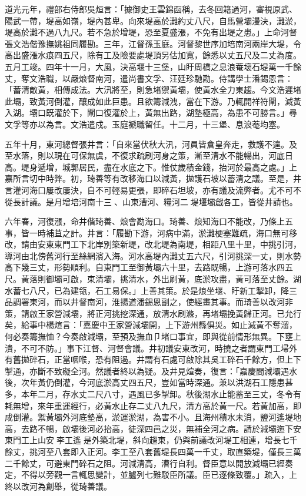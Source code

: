 \begin{pinyinscope}
道光元年，禮部右侍郎吳烜言：「據御史王雲錦函稱，去冬回籍過河，審視原武、陽武一帶，堤高如嶺，堤內甚卑。向來堤高於灘約丈八尺，自馬營壩漫決，灘淤，堤高於灘不過八九尺。若不急於增堤，恐至夏盛漲，不免有出堤之患。」上命河督張文浩偕豫撫姚祖同履勘。三年，江督孫玉庭。河督黎世序加培南河兩岸大堤，令高出盛漲水痕四五尺，除有工及險要處堤頂另估加寬，餘悉以丈五尺及二丈為度。五月工竣。四年十一月，大風，決高堰十三堡，山盱周橋之息浪菴壞石堤萬一千餘丈，奪文浩職，以嚴烺督南河，遣尚書文孚、汪廷珍馳勘。侍講學士潘錫恩言：「蓄清敵黃，相傳成法。大汛將至，則急堵禦黃壩，使黃水全力東趨。今文浩遲堵此壩，致黃河倒灌，釀成如此巨患。且欲籌減洩，當在下游。乃輒開祥符閘，減黃入湖。壩口既灌於下，閘口復灌於上，黃無出路，湖墊極高，為患不可勝言。」尋文孚等亦以為言。文浩遣戍。玉庭褫職留任。十二月，十三堡、息浪菴均塞。

五年十月，東河總督張井言：「自來當伏秋大汛，河員皆倉皇奔走，救護不遑。及至水落，則以現在可保無虞，不復求疏刷河身之策，漸至清水不能暢出，河底日高。堤身遞增，城郭居民，盡在水底之下。惟仗歲積金錢，抬河於最高之處。」上嘉所言切中時弊。初，琦善等有改移海口以減黃，拋護石坡以蓄清之議。至是，井言灌河海口屢改屢決，自不可輕易更張，即碎石坦坡，亦有議及流弊者。尤不可不從長計議。是月增培河南十三、山東漕河、糧河二堤堰壩戧各工，皆從井請也。

六年春，河復漲，命井偕琦善、烺會勘海口。琦善、烺知海口不能改，乃條上五事，皆一時補苴之計。井言：「履勘下游，河病中滿，淤灘梗塞難疏，海口無可移改，請由安東東門工下北岸別築新堤，改北堤為南堤，相距八里十里，中挑引河，導河由北傍舊河行至絲網濱入海。河水高堤內灘丈五六尺，引河挑深一丈，則水勢高下幾三丈，形勢順利。自東門工至御黃壩六十里，去路既暢，上游可落水四五尺。黃落則御壩可啟，束清壩，挑清水，外出刷黃，底淤攻盡，黃可落至丈餘。湖水蓄七八尺，已為建瓴，石工易保。」上善其策。於是烺坐堰、盱新工掣卸，降三品調署東河，而以井督南河，淮揚道潘錫恩副之，使經畫其事。而琦善以改河非策，請啟王家營減壩，將正河挑挖深通，放清水刷滌，再堵壩挽黃歸正河。已允行矣，給事中楊煊言：「嘉慶中王家營減壩開，上下游州縣俱災。如止減黃不奪溜，何必奏籌撫恤？今奏啟減壩，至預及撫血⼙堵口事宜，即與從前情形無異。下壅上潰，不可不防。」事下江督、河督會議。井初議安東改河，時撓之者謂東門工埽外有舊拋碎石，正當咽喉，恐有阻遏。井謂有石處可啟除其吳工碎石千餘方，但上下掣通，亦斷不致礙全河。然議者終以為疑。及井見煊奏，復言：「嘉慶間減壩遇水後，次年黃仍倒灌，今河底淤高丈四五尺，豈如當時深通。兼以洪湖石工隱患甚多，本年二月，存水丈二尺八寸，遇風已多掣卸。秋後湖水止能蓄至三丈，冬令有耗無增，來年重運經行，必黃水止存二丈八九尺，清方高於黃一尺。若黃加高，即成倒灌。禦黃壩外河底墊高，淤運淤湖，為害不小。且海州積水未消，鹽河遙堤地高，去路不暢，啟壩後河必抬高，徒深四邑之災，無補全河之病。請於減壩迤下安東門工上山安李工遙是外築北堤，斜向趨東，仍與前議改河堤工相連，增長七千餘丈，挑河至八套即入正河。李工至八套舊堤長四萬一千丈，取直築堤，僅長三萬二千餘丈，可避東門碎石之阻。河減清高，漕行自利。督臣意以開放減壩已經奏定，不得以旁觀一言輒思變計，並臚列七難駁臣所議。臣已逐條致覆。」疏入，上終以改河為創舉，從琦善議。


\end{pinyinscope}
